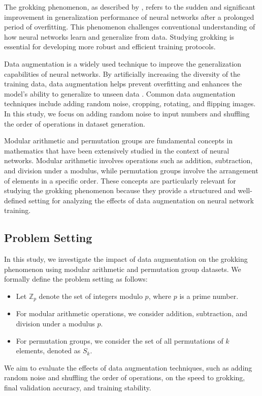 \documentclass{article} %
\begin{document}
The grokking phenomenon, as described by \citet{power2022grokking}, refers to the sudden and significant improvement in generalization performance of neural networks after a prolonged period of overfitting. This phenomenon challenges conventional understanding of how neural networks learn and generalize from data. Studying grokking is essential for developing more robust and efficient training protocols.

Data augmentation is a widely used technique to improve the generalization capabilities of neural networks. By artificially increasing the diversity of the training data, data augmentation helps prevent overfitting and enhances the model's ability to generalize to unseen data \citep{goodfellow2016deep}. Common data augmentation techniques include adding random noise, cropping, rotating, and flipping images. In this study, we focus on adding random noise to input numbers and shuffling the order of operations in dataset generation.

Modular arithmetic and permutation groups are fundamental concepts in mathematics that have been extensively studied in the context of neural networks. Modular arithmetic involves operations such as addition, subtraction, and division under a modulus, while permutation groups involve the arrangement of elements in a specific order. These concepts are particularly relevant for studying the grokking phenomenon because they provide a structured and well-defined setting for analyzing the effects of data augmentation on neural network training.

\subsection{Problem Setting}
\label{sec:problem_setting}
In this study, we investigate the impact of data augmentation on the grokking phenomenon using modular arithmetic and permutation group datasets. We formally define the problem setting as follows:
\begin{itemize}
    \item Let \( \mathbb{Z}_p \) denote the set of integers modulo \( p \), where \( p \) is a prime number.
    \item For modular arithmetic operations, we consider addition, subtraction, and division under a modulus \( p \).
    \item For permutation groups, we consider the set of all permutations of \( k \) elements, denoted as \( S_k \).
\end{itemize}
We aim to evaluate the effects of data augmentation techniques, such as adding random noise and shuffling the order of operations, on the speed to grokking, final validation accuracy, and training stability.
\end{document}
